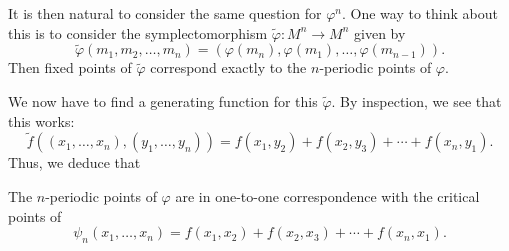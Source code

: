 \documentclass[a4paper]{article}
\begin{document}
It is then natural to consider the same question for $\varphi^n$. One way to think about this is to consider the symplectomorphism $\tilde{\varphi}: M^n \to M^n$ given by
\[
  \tilde{\varphi}(m_1, m_2, \ldots, m_n) = (\varphi(m_n), \varphi(m_1), \ldots, \varphi(m_{n - 1})).
\]
Then fixed points of $\tilde{\varphi}$ correspond exactly to the $n$-periodic points of $\varphi$.

We now have to find a generating function for this $\tilde{\varphi}$. By inspection, we see that this works:
\[
  \tilde{f}((x_1, \ldots, x_n), (y_1, \ldots, y_n)) = f(x_1, y_2) + f(x_2, y_3) + \cdots + f(x_n, y_1).
\]
Thus, we deduce that
\begin{prop}
  The $n$-periodic points of $\varphi$ are in one-to-one correspondence with the critical points of
  \[
    \psi_n(x_1, \ldots, x_n) = f(x_1, x_2) + f(x_2, x_3) + \cdots + f(x_n, x_1).
  \]
\end{prop}
%
%
\end{document}
